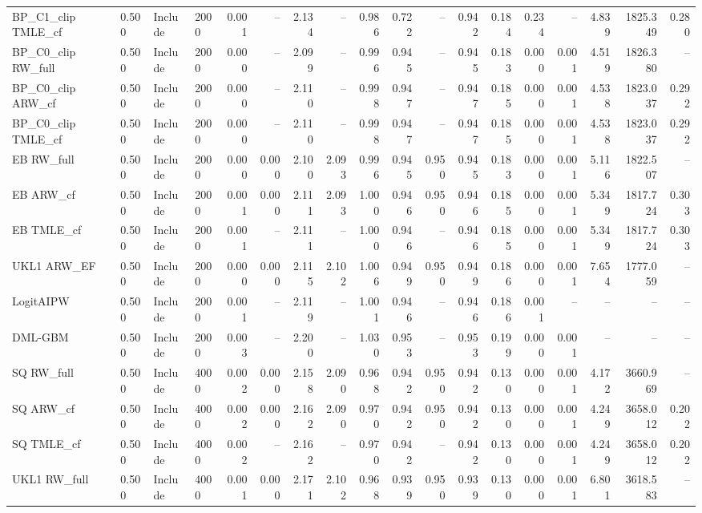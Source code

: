 \begin{tabular}{llllrrrrrrrrrrrrrr}
BP\_C1\_clip TMLE\_cf & 0.500 & Include & 2000 & 0.001 & -- & 2.134 & -- & 0.986 & 0.722 & -- & 0.942 & 0.184 & 0.234 & -- & 4.839 & 1825.349 & 0.280 \\
BP\_C0\_clip RW\_full & 0.500 & Include & 2000 & 0.000 & -- & 2.099 & -- & 0.996 & 0.945 & -- & 0.945 & 0.183 & 0.000 & 0.001 & 4.519 & 1826.380 & -- \\
BP\_C0\_clip ARW\_cf & 0.500 & Include & 2000 & 0.000 & -- & 2.110 & -- & 0.998 & 0.947 & -- & 0.947 & 0.185 & 0.000 & 0.001 & 4.538 & 1823.037 & 0.292 \\
BP\_C0\_clip TMLE\_cf & 0.500 & Include & 2000 & 0.000 & -- & 2.110 & -- & 0.998 & 0.947 & -- & 0.947 & 0.185 & 0.000 & 0.001 & 4.538 & 1823.037 & 0.292 \\
EB RW\_full & 0.500 & Include & 2000 & 0.000 & 0.000 & 2.100 & 2.093 & 0.996 & 0.945 & 0.950 & 0.945 & 0.183 & 0.000 & 0.001 & 5.116 & 1822.507 & -- \\
EB ARW\_cf & 0.500 & Include & 2000 & 0.001 & 0.000 & 2.111 & 2.093 & 1.000 & 0.946 & 0.950 & 0.946 & 0.185 & 0.000 & 0.001 & 5.349 & 1817.724 & 0.303 \\
EB TMLE\_cf & 0.500 & Include & 2000 & 0.001 & -- & 2.111 & -- & 1.000 & 0.946 & -- & 0.946 & 0.185 & 0.000 & 0.001 & 5.349 & 1817.724 & 0.303 \\
UKL1 ARW\_EF & 0.500 & Include & 2000 & 0.000 & 0.000 & 2.115 & 2.102 & 1.006 & 0.949 & 0.950 & 0.949 & 0.186 & 0.000 & 0.001 & 7.654 & 1777.059 & -- \\
LogitAIPW & 0.500 & Include & 2000 & 0.001 & -- & 2.119 & -- & 1.001 & 0.946 & -- & 0.946 & 0.186 & 0.001 & -- & -- & -- & -- \\
DML-GBM & 0.500 & Include & 2000 & 0.003 & -- & 2.200 & -- & 1.030 & 0.953 & -- & 0.953 & 0.199 & 0.000 & 0.001 & -- & -- & -- \\
SQ RW\_full & 0.500 & Include & 4000 & 0.002 & 0.000 & 2.158 & 2.090 & 0.968 & 0.942 & 0.950 & 0.942 & 0.130 & 0.000 & 0.001 & 4.172 & 3660.969 & -- \\
SQ ARW\_cf & 0.500 & Include & 4000 & 0.002 & 0.000 & 2.162 & 2.090 & 0.970 & 0.942 & 0.950 & 0.942 & 0.130 & 0.000 & 0.001 & 4.249 & 3658.012 & 0.202 \\
SQ TMLE\_cf & 0.500 & Include & 4000 & 0.002 & -- & 2.162 & -- & 0.970 & 0.942 & -- & 0.942 & 0.130 & 0.000 & 0.001 & 4.249 & 3658.012 & 0.202 \\
UKL1 RW\_full & 0.500 & Include & 4000 & 0.001 & 0.000 & 2.171 & 2.102 & 0.968 & 0.939 & 0.950 & 0.939 & 0.130 & 0.000 & 0.001 & 6.801 & 3618.583 & -- \\

\end{tabular}
